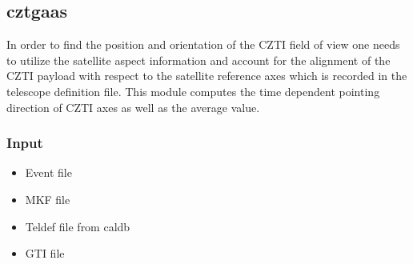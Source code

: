 \documentclass[11pt,oneside,a4paper]{article}
\begin{document}

\subsection{cztgaas}

In  order  to  find  the  position  and  orientation  of  the  CZTI  field  of  view  
one  needs  to  utilize  the  satellite  aspect  information and  account  for  the alignment  of  
the  CZTI  payload with  respect  to  the  satellite reference  axes which is recorded in the 
telescope definition file. This module computes the time dependent pointing direction of CZTI axes 
as well as the average value.

\subsubsection*{Input}
\renewcommand\labelitemi{{\boldmath$\cdot$}}
\begin{itemize}
\item{Event file}
\item{MKF file}
\item{Teldef file from caldb}
\item{GTI file}
\end{itemize}
\end{document}
